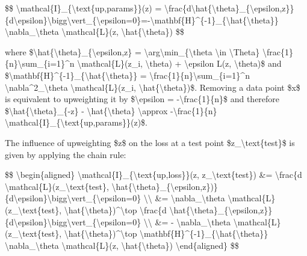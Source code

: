 \$\$ \textbackslash mathcal\{I\}\_\{\textbackslash text\{up,params\}\}(z) = \textbackslash frac\{d\textbackslash hat\{\textbackslash theta\}\_\{\textbackslash epsilon,z\}\}\{d\textbackslash epsilon\}\textbackslash bigg\textbackslash vert\_\{\textbackslash epsilon=0\}=-\textbackslash mathbf\{H\}\^{}\{-1\}\_\{\textbackslash hat\{\textbackslash theta\}\} \textbackslash nabla\_\textbackslash theta \textbackslash mathcal\{L\}(z, \textbackslash hat\{\textbackslash theta\}) \$\$

where \$\textbackslash hat\{\textbackslash theta\}\_\{\textbackslash epsilon,z\} = \textbackslash arg\textbackslash min\_\{\textbackslash theta \textbackslash in \textbackslash Theta\} \textbackslash frac\{1\}\{n\}\textbackslash sum\_\{i=1\}\^{}n \textbackslash mathcal\{L\}(z\_i, \textbackslash theta) + \textbackslash epsilon L(z, \textbackslash theta)\$ and \$\textbackslash mathbf\{H\}\^{}\{-1\}\_\{\textbackslash hat\{\textbackslash theta\}\} = \textbackslash frac\{1\}\{n\}\textbackslash sum\_\{i=1\}\^{}n \textbackslash nabla\^{}2\_\textbackslash theta \textbackslash mathcal\{L\}(z\_i, \textbackslash hat\{\textbackslash theta\})\$. Removing a data point \$x\$ is equivalent to upweighting it by \$\textbackslash epsilon = -\textbackslash frac\{1\}\{n\}\$ and therefore \$\textbackslash hat\{\textbackslash theta\}\_\{-z\} - \textbackslash hat\{\textbackslash theta\} \textbackslash approx -\textbackslash frac\{1\}\{n\} \textbackslash mathcal\{I\}\_\{\textbackslash text\{up,params\}\}(z)\$.

The influence of upweighting \$z\$ on the loss at a test point \$z\_\textbackslash text\{test\}\$ is given by applying the chain rule:

\$\$ \textbackslash begin\{aligned\} \textbackslash mathcal\{I\}\_\{\textbackslash text\{up,loss\}\}(z, z\_\textbackslash text\{test\}) \&= \textbackslash frac\{d \textbackslash mathcal\{L\}(z\_\textbackslash text\{test\}, \textbackslash hat\{\textbackslash theta\}\_\{\textbackslash epsilon,z\})\}\{d\textbackslash epsilon\}\textbackslash bigg\textbackslash vert\_\{\textbackslash epsilon=0\} \textbackslash\textbackslash{} \&= \textbackslash nabla\_\textbackslash theta \textbackslash mathcal\{L\}(z\_\textbackslash text\{test\}, \textbackslash hat\{\textbackslash theta\})\^{}\textbackslash top \textbackslash frac\{d \textbackslash hat\{\textbackslash theta\}\_\{\textbackslash epsilon,z\}\}\{d\textbackslash epsilon\}\textbackslash bigg\textbackslash vert\_\{\textbackslash epsilon=0\} \textbackslash\textbackslash{} \&= - \textbackslash nabla\_\textbackslash theta \textbackslash mathcal\{L\}(z\_\textbackslash text\{test\}, \textbackslash hat\{\textbackslash theta\})\^{}\textbackslash top \textbackslash mathbf\{H\}\^{}\{-1\}\_\{\textbackslash hat\{\textbackslash theta\}\} \textbackslash nabla\_\textbackslash theta \textbackslash mathcal\{L\}(z, \textbackslash hat\{\textbackslash theta\}) \textbackslash end\{aligned\} \$\$

